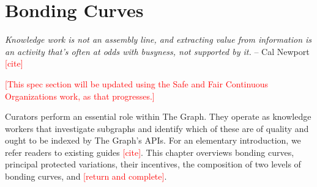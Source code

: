 \chapter{Bonding Curves}
{\justifying

\textit{Knowledge work is not an assembly line, and extracting value from information is an activity that’s often at odds with busyness, not supported by it.} \hfill -- Cal Newport \textcolor{red}{[cite]}

\vspace{0.25in}

\textcolor{red}{[This spec section will be updated using the Safe and Fair Continuous Organizations work, as that progresses.]}
 
Curators perform an essential role within The Graph. They operate as knowledge workers that investigate subgraphs and identify which of these are of quality and ought to be indexed by The Graph's APIs. For an elementary introduction, we refer readers to   existing guides \textcolor{red}{[cite]}. This chapter overviews bonding curves, principal protected variations, their incentives, the composition of two levels of bonding curves, and \textcolor{red}{[return and complete]}. 

\begin{sidefigure}
    \centering 
\end{sidefigure}}
